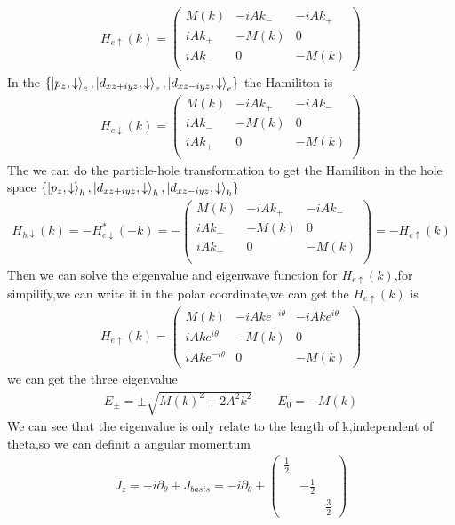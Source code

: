 \documentclass[4pt]{article}
\begin{document}
\begin{align}
	H_{e\uparrow}(k)=
	\begin{pmatrix}
		M(k)&-iAk_{-}&-iAk_{+}\\
		iAk_{+}&-M(k)&0\\
		iAk_{-}&0&-M(k)\\
	\end{pmatrix}
\end{align}
	In the $\{\ket{p_z,\downarrow}_e,\ket{d_{xz+iyz},\downarrow}_e,\ket{d_{xz-iyz},\downarrow}_e\}$ the Hamiliton is 
\begin{align}
	H_{e\downarrow}(k)=
		\begin{pmatrix}
		M(k)&-iAk_{+}&-iAk_{-}\\
		iAk_{-}&-M(k)&0\\
		iAk_{+}&0&-M(k)\\
	\end{pmatrix}
\end{align}
The we can do the particle-hole transformation to get the Hamiliton in the hole space $\{\ket{p_z,\downarrow}_h,\ket{d_{xz+iyz},\downarrow}_h,\ket{d_{xz-iyz},\downarrow}_h\}$
\begin{align}
	H_{h\downarrow}(k)=-H_{e\downarrow}^{*}(-k)=
	-
	\begin{pmatrix}
			M(k)&-iAk_{+}&-iAk_{-}\\
			iAk_{-}&-M(k)&0\\
			iAk_{+}&0&-M(k)\\
	\end{pmatrix}
=-H_{e\uparrow}(k)
\end{align}
	Then we can solve the eigenvalue and eigenwave function for $H_{e\uparrow}(k)$,for simpilify,we can write it in the polar coordinate,we can get the $H_{e\uparrow}(k)$ is
	\begin{align}
		H_{e\uparrow}(k)=
		\begin{pmatrix}
			M(k)&-iAke^{-i\theta}&-iAke^{i\theta}\\
			iAke^{i\theta}&-M(k)&0\\
			iAke^{-i\theta}&0&-M(k)
		\end{pmatrix}
	\end{align}
	we can get the three eigenvalue
	\begin{align}
		E_{\pm}=\pm\sqrt{M(k)^2+2A^2k^2} \qquad E_0=-M(k)
	\end{align}
	We can see that the eigenvalue is only relate to the length of k,independent of theta,so we can definit a angular momentum
	\begin{align}
		J_z=-i\partial_{\theta}+J_{basis}=-i\partial_{\theta}+
		\begin{pmatrix}
			\frac{1}{2}&&\\
			&-\frac{1}{2}&\\
			&&\frac{3}{2}
		\end{pmatrix}
	\end{align}
\end{document}
